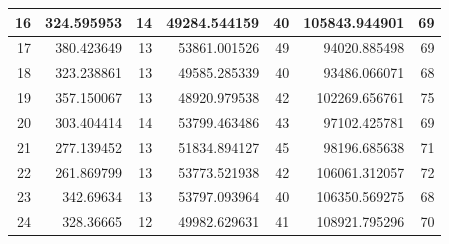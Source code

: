 \begin{table}
\begin{adjustwidth}{}{}
{{\begin{tabular}{|r|r|r|r|r|r|r|}
					\hline
					16                                         & 324.595953                   & 14                                    & 49284.544159                   & 40                                    & 105843.944901                & 69                                     \\ 
					\hline
					17                                         & 380.423649                   & 13                                    & 53861.001526                   & 49                                    & 94020.885498                 & 69                                     \\ 
					\hline
					18                                         & 323.238861                   & 13                                    & 49585.285339                   & 40                                    & 93486.066071                 & 68                                     \\ 
					\hline
					19                                         & 357.150067                   & 13                                    & 48920.979538                   & 42                                    & 102269.656761                & 75                                     \\ 
					\hline
					20                                         & 303.404414                   & 14                                    & 53799.463486                   & 43                                    & 97102.425781                 & 69                                     \\ 
					\hline
					21                                         & 277.139452                   & 13                                    & 51834.894127                   & 45                                    & 98196.685638                 & 71                                     \\ 
					\hline
					22                                         & 261.869799                   & 13                                    & 53773.521938                   & 42                                    & 106061.312057                & 72                                     \\ 
					\hline
					23                                         & 342.69634                    & 13                                    & 53797.093964                   & 40                                    & 106350.569275                & 68                                     \\ 
					\hline
					24                                         & 328.36665                    & 12                                    & 49982.629631                   & 41                                    & 108921.795296                & 70                                     \\ 

\end{tabular}}}
\end{adjustwidth}
\end{table}

